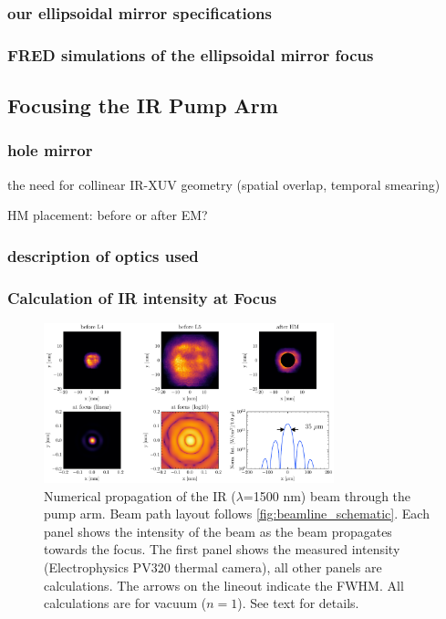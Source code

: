 \subsubsection{our ellipsoidal mirror specifications}

\subsubsection{FRED simulations of the ellipsoidal mirror focus}

\subsection{Focusing the IR Pump Arm}

\subsubsection{hole mirror}
the need for collinear IR-XUV geometry (spatial overlap, temporal smearing)

HM placement: before or after EM?

\subsubsection{description of optics used}

\subsubsection{Calculation of IR intensity at Focus}

\begin{figure}
	\centering
	\includegraphics[width=0.75\textwidth]{figures/chap2/pump_on_focus_calculation_8192_inferno.pdf}
	\caption{Numerical propagation of the IR ($\lambda$=1500 nm) beam through the pump arm. Beam path layout follows \cref{fig:beamline_schematic}. Each panel shows the intensity of the beam as the beam propagates towards the focus. The first panel shows the measured intensity (Electrophysics PV320 thermal camera), all other panels are calculations. The arrows on the lineout indicate the FWHM. All calculations are for vacuum ($n=1$). See text for details.}
	\label{fig:pump_on_focus_calculation}
\end{figure}

